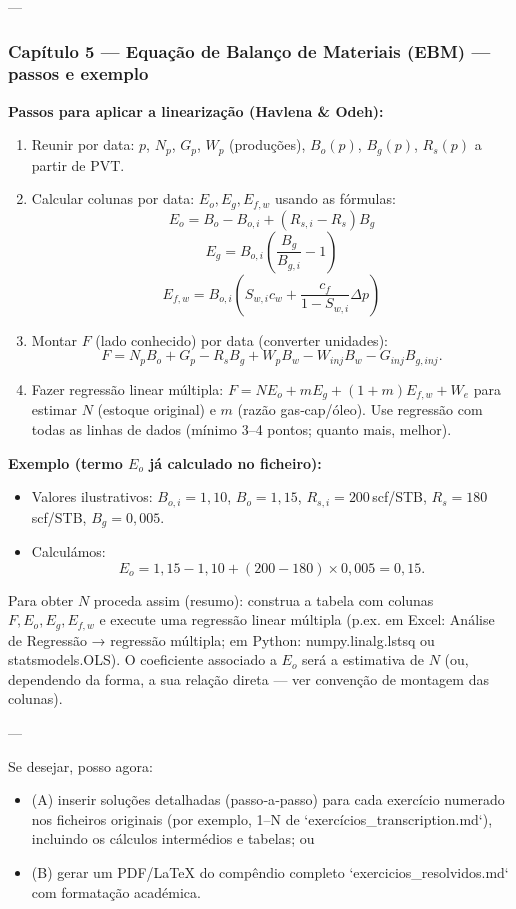 \documentclass[11pt,a4paper]{article}
\begin{document}
---

\subsubsection{Capítulo 5 — Equação de Balanço de Materiais (EBM) — passos e exemplo}

\textbf{Passos para aplicar a linearização (Havlena \& Odeh):}
\begin{enumerate}
\item Reunir por data: $p$, $N_p$, $G_p$, $W_p$ (produções), $B_o(p)$, $B_g(p)$, $R_s(p)$ a partir de PVT.
\item Calcular colunas por data: $E_o,E_g,E_{f,w}$ usando as fórmulas:
$$E_o = B_o - B_{o,i} + (R_{s,i}-R_s)B_g$$
$$E_g = B_{o,i}\left(\dfrac{B_g}{B_{g,i}} - 1\right)$$
$$E_{f,w} = B_{o,i}\left(S_{w,i}c_w + \dfrac{c_f}{1-S_{w,i}}\Delta p\right)$$
\item Montar $F$ (lado conhecido) por data (converter unidades):
$$F = N_p B_o + G_p - R_s B_g + W_p B_w - W_{inj} B_w - G_{inj} B_{g,inj}.$$ 
\item Fazer regressão linear múltipla: $F = N E_o + m E_g + (1+m) E_{f,w} + W_e$ para estimar $N$ (estoque original) e $m$ (razão gas‑cap/óleo). Use regressão com todas as linhas de dados (mínimo 3–4 pontos; quanto mais, melhor).
\end{enumerate}

\textbf{Exemplo (termo $E_o$ já calculado no ficheiro):}
\begin{itemize}
\item Valores ilustrativos: $B_{o,i}=1{,}10$, $B_o=1{,}15$, $R_{s,i}=200\,$scf/STB, $R_s=180\,$scf/STB, $B_g=0{,}005$.
\item Calculámos:
$$E_o=1{,}15-1{,}10+(200-180)\times0{,}005=0{,}15.$$ 
\end{itemize}

Para obter $N$ proceda assim (resumo): construa a tabela com colunas $F,E_o,E_g,E_{f,w}$ e execute uma regressão linear múltipla (p.ex. em Excel: Análise de Regressão → regressão múltipla; em Python: numpy.linalg.lstsq ou statsmodels.OLS). O coeficiente associado a $E_o$ será a estimativa de $N$ (ou, dependendo da forma, a sua relação direta — ver convenção de montagem das colunas).

---

Se desejar, posso agora:
\begin{itemize}
\item (A) inserir soluções detalhadas (passo‑a‑passo) para cada exercício numerado nos ficheiros originais (por exemplo, 1–N de `exercícios_transcription.md`), incluindo os cálculos intermédios e tabelas; ou
\item (B) gerar um PDF/LaTeX do compêndio completo `exercicios_resolvidos.md` com formatação académica.
\end{itemize}
\end{document}
